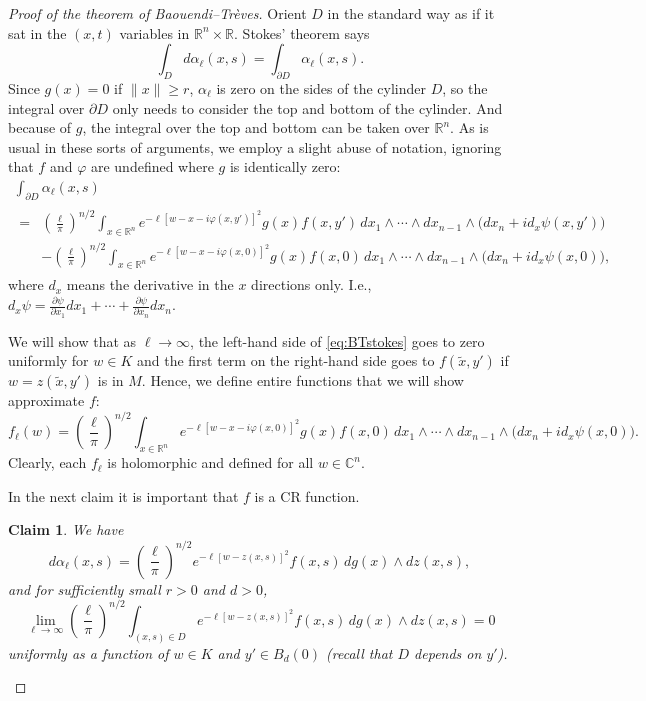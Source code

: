 \documentclass[12pt,openany]{book}
\newcommand{\snorm}[1]{\lVert {#1} \rVert}
\newcommand{\C}{{\mathbb{C}}}
\newcommand{\R}{{\mathbb{R}}}
\theoremstyle{plain}
\newtheorem{claim}[thm]{Claim}
\theoremstyle{remark}
\theoremstyle{definition}
\theoremstyle{exercise}
\theoremstyle{example}
\begin{document}
\begin{proof}[Proof of the theorem of Baouendi--Tr{\`e}ves]
Orient $D$ in
the standard way as if it sat in the $(x,t)$ variables in $\R^n \times \R$.
Stokes' theorem says
\begin{equation*}
\int_D d \alpha_{\ell} (x,s)
=
\int_{\partial D} \alpha_{\ell} (x,s) .
\end{equation*}
Since $g(x) = 0$ if $\snorm{x} \geq r$, $\alpha_\ell$ is zero on the sides
of the cylinder $D$, so the integral over $\partial D$ only needs to
consider the top and bottom of the cylinder.
And because of $g$, the integral over the top and bottom
can be taken over $\R^n$.
As is usual in these sorts of arguments, we employ a slight abuse of
notation,
ignoring that $f$ and $\varphi$ are undefined
where $g$ is identically zero:
\begin{multline} \label{eq:BTstokes}
\int_{\partial D} \alpha_{\ell}(x,s)
\\
\begin{aligned}
=
&
{\left(\frac{\ell}{\pi}\right)}^{n/2}
\int_{x \in \R^n}
\!\!\!
e^{-\ell [w - x-i\varphi(x,y')]^2 } g(x) f(x,y')
\,
dx_1  \wedge
\cdots \wedge
dx_{n-1}
\wedge
\bigl(dx_{n} + i d_x \psi (x,y') \bigr)
\\
&
-
{\left(\frac{\ell}{\pi}\right)}^{n/2}
\int_{x \in \R^n}
\!\!\!
e^{  -\ell [w - x-i\varphi(x,0)]^2 } g(x) f(x,0)
\,
dx_1  \wedge
\cdots \wedge
dx_{n-1}
\wedge
\bigl(dx_{n} + i d_x \psi (x,0) \bigr) ,
\end{aligned}
\end{multline}
where $d_x$ means the derivative in the $x$ directions only.
I.e., $d_x \psi =
\frac{\partial \psi}{\partial x_1} dx_1
+ \cdots +
\frac{\partial \psi}{\partial x_n} dx_n$.


We will show that as $\ell \to \infty$, the left-hand side of \eqref{eq:BTstokes}
goes to zero uniformly for $w \in K$
and the first term on the right-hand side goes to $f(\tilde{x},y')$
if $w = z(\tilde{x},y')$ is in $M$.  Hence,
we define entire functions that we will show approximate $f$:
\begin{equation*}
f_\ell(w)
=
{\left(\frac{\ell}{\pi}\right)}^{n/2}
\int_{x \in \R^n}
e^{  -\ell [w - x-i\varphi(x,0)]^2 } g(x) f(x,0)
\,
dx_1  \wedge
\cdots \wedge
dx_{n-1}
\wedge
\bigl(dx_{n} + i d_x \psi (x,0) \bigr) .
\end{equation*}
Clearly, each $f_\ell$ is holomorphic and defined for all $w \in \C^n$.

In the next claim it is important that $f$ is a CR function.

\begin{claim}
\pagebreak[2]
We have
\begin{equation*}
d \alpha_\ell(x,s)
=
{\left(\frac{\ell}{\pi}\right)}^{n/2}
e^{-\ell [w - z(x,s)]^2} f(x,s)
\,
dg(x)
\wedge
dz(x,s) ,
\end{equation*}
and for sufficiently small $r>0$ and $d>0$,
\begin{equation*}
\lim_{\ell\to\infty}
{\left(\frac{\ell}{\pi}\right)}^{n/2}
\int_{(x,s)\in D}
e^{-\ell [w - z(x,s)]^2} f(x,s)
\,
dg(x)
\wedge
dz(x,s)
= 0
\end{equation*}
uniformly as a function of $w \in K$ and $y' \in B_d(0)$ (recall that $D$ depends on
$y'$).
\end{claim}


\end{proof}
\end{document}
